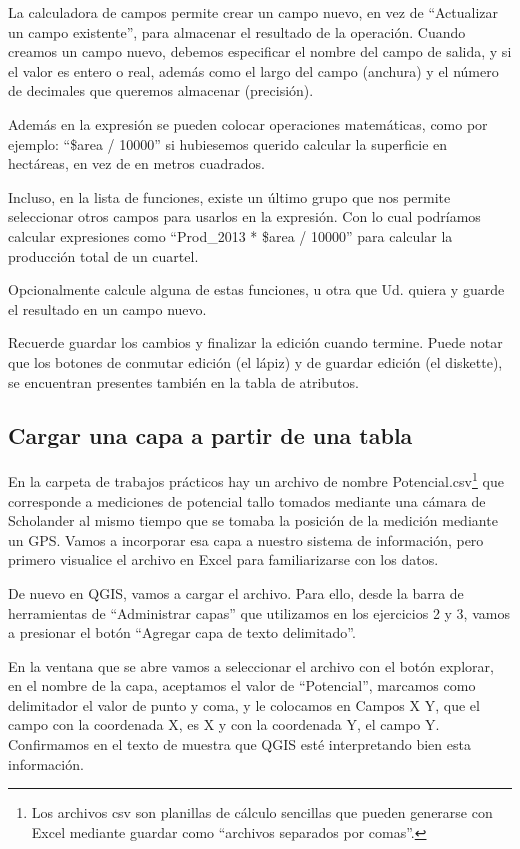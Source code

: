 \documentclass[onecolumn]{article}
\begin{document}
La calculadora de campos permite crear un campo nuevo, en vez de “Actualizar un campo existente”, para almacenar el resultado de la operación. Cuando creamos un campo nuevo, debemos especificar el nombre del campo de salida, y si el valor es entero o real, además como el largo del campo (anchura) y el número de decimales que queremos almacenar (precisión). 

Además en la expresión se pueden colocar operaciones matemáticas, como por ejemplo: “\$area / 10000” si hubiesemos querido calcular la superficie en hectáreas, en vez de en metros cuadrados. 

Incluso, en la lista de funciones, existe un último grupo que nos permite seleccionar otros campos para usarlos en la expresión. Con lo cual podríamos calcular expresiones como “Prod\_2013 * \$area / 10000” para calcular la producción total de un cuartel. 

Opcionalmente calcule alguna de estas funciones, u otra que Ud. quiera y guarde el resultado en un campo nuevo.

Recuerde guardar los cambios y finalizar la edición cuando termine. Puede notar que los botones de conmutar edición (el lápiz) y de guardar edición (el diskette), se encuentran presentes también en la tabla de atributos.

\subsection{Cargar una capa a partir de una tabla}

En la carpeta de trabajos prácticos hay un archivo de nombre Potencial.csv\footnote{Los archivos csv son planillas de cálculo sencillas que pueden generarse con Excel mediante guardar como “archivos separados por comas”.} que corresponde a mediciones de potencial tallo tomados mediante una cámara de Scholander al mismo tiempo que se tomaba la posición de la medición mediante un GPS. Vamos a incorporar esa capa a nuestro sistema de información, pero primero visualice el archivo en Excel para familiarizarse con los datos. 


De nuevo en QGIS, vamos a cargar el archivo. Para ello, desde la barra de herramientas de “Administrar capas” que utilizamos en los ejercicios 2 y 3, vamos a presionar el botón “Agregar capa de texto delimitado”.

En la ventana que se abre vamos a seleccionar el archivo con el botón explorar, en el nombre de la capa, aceptamos el valor de “Potencial”, marcamos como delimitador el valor de punto y coma, y le colocamos en Campos X Y, que el campo con la coordenada X, es X y con la coordenada Y, el campo Y. Confirmamos en el texto de muestra que QGIS esté interpretando bien esta información.
\end{document}
